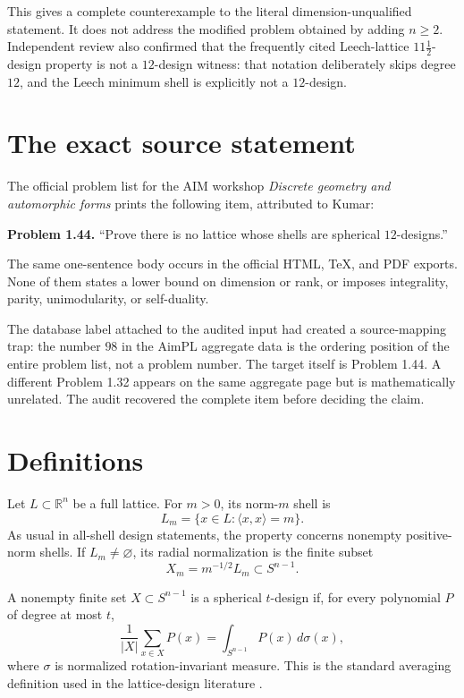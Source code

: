 \documentclass[11pt]{article}
\theoremstyle{argusplain}
\begin{document}
This gives a complete counterexample to the literal dimension-unqualified statement. It does not address the modified problem obtained by adding $n\geq2$. Independent review also confirmed that the frequently cited Leech-lattice $11\tfrac12$-design property is not a $12$-design witness: that notation deliberately skips degree $12$, and the Leech minimum shell is explicitly not a $12$-design.

\section{The exact source statement}

The official problem list for the AIM workshop \emph{Discrete geometry and automorphic forms} prints the following item, attributed to Kumar:

\begin{scopebox}
\centering
\textbf{Problem 1.44.} ``Prove there is no lattice whose shells are spherical $12$-designs.''
\end{scopebox}

The same one-sentence body occurs in the official HTML, TeX, and PDF exports. None of them states a lower bound on dimension or rank, or imposes integrality, parity, unimodularity, or self-duality.

The database label attached to the audited input had created a source-mapping trap: the number $98$ in the AimPL aggregate data is the ordering position of the entire problem list, not a problem number. The target itself is Problem 1.44. A different Problem 1.32 appears on the same aggregate page but is mathematically unrelated. The audit recovered the complete item before deciding the claim.

\section{Definitions}

Let $L\subset\mathbb R^n$ be a full lattice. For $m>0$, its norm-$m$ shell is
\[
  L_m=\{x\in L:\langle x,x\rangle=m\}.
\]
As usual in all-shell design statements, the property concerns nonempty positive-norm shells. If $L_m\neq\varnothing$, its radial normalization is the finite subset
\[
  X_m=m^{-1/2}L_m\subset S^{n-1}.
\]

A nonempty finite set $X\subset S^{n-1}$ is a spherical $t$-design if, for every polynomial $P$ of degree at most $t$,
\[
  \frac1{|X|}\sum_{x\in X}P(x)
  =\int_{S^{n-1}}P(x)\,d\sigma(x),
\]
where $\sigma$ is normalized rotation-invariant measure. This is the standard averaging definition used in the lattice-design literature \cite{VenkovMartinet,Pache2005}.
\end{document}
